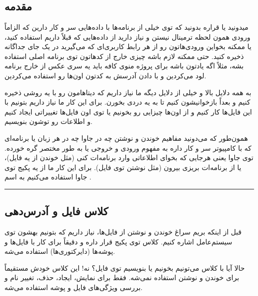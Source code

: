 \chapter{\DocTitle}
\section{مقدمه}

میدونید یا قراره بدونید که توی خیلی از برنامه‌ها با داده‌هایی سر و کار
دارین که الزاماً ورودی همون لحظه ترمینال نیستن و نیاز دارید از داده‌هایی
که قبلاً داریم استفاده کنید، یا ممکنه بخواین ورودی‌هاتون رو از هر رابط
کاربری‌ای که می‌گیرید در یک جای جداگانه ذخیره کنید. حتی ممکنه لازم باشه
چیزی خارج از کدهاتون توی برنامه اصلی استفاده بشه، مثلاً اگه یادتون باشه
برای پروژه منوی کافه باید یه سری عکس از خارج برنامه لود می‌کردین و با
دادن آدرسش به کدتون اون‌ها رو استفاده می‌کردین.

به همه دلایل بالا و خیلی از دلایل دیگه ما نیاز داریم که دیتاهامون رو با
یه روشی ذخیره کنیم و بعداً بازخوانیشون کنیم تا به یه دردی بخورن. برای این
کار ما نیاز داریم بتونیم با این فایل‌ها کار کنیم و از اون‌ها چیزایی رو
بخونیم یا توی اون فایل‌ها تغییراتی ایجاد کنیم و اطلاعات رو توشون بنویسیم.

همون‌طور که می‌دونید مفاهیم خوندن و نوشتن چه در جاوا چه در هر زبان یا
برنامه‌ای که با کامپیوتر سر و کار داره به مفهوم ورودی و خروجی یا به طور
مختصر  گره خورده. توی جاوا یعنی هرجایی که بخوای اطلاعاتی وارد
برنامه‌ات کنی (مثل خوندن از یه فایل)، یا از برنامه‌ات بریزی بیرون (مثل
نوشتن توی فایل). برای این کار ما از یه پکیج توی جاوا استفاده می‌کنیم به
اسم .

\begin{center}\rule{0.5\linewidth}{0.5pt}\end{center}

\section{کلاس فایل  و آدرس‌دهی}

قبل از اینکه بریم سراغ خوندن و نوشتن از فایل‌ها، نیاز داریم که بتونیم
بهشون توی سیستم‌عامل اشاره کنیم. کلاس  توی پکیج
 قرار داره و دقیقاً برای کار با فایل‌ها و پوشه‌ها
(دایرکتوری‌ها) استفاده می‌شه.

حالا آیا با کلاس  می‌تونیم بخونیم یا بنویسیم توی فایل؟
نه! این کلاس خودش مستقیماً برای خوندن و نوشتن استفاده نمی‌شه. فقط برای
نمایش، ایجاد، حذف، تغییر نام و بررسی ویژگی‌های فایل و پوشه استفاده می‌شه.

